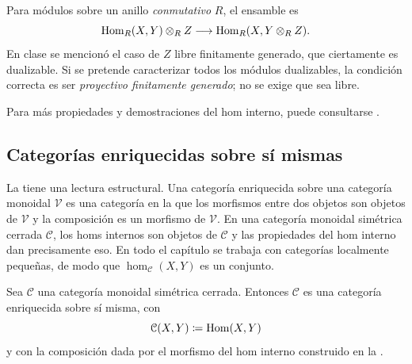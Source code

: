 \begin{nota}
Para módulos sobre un anillo \emph{conmutativo} $R$, el ensamble es
\[
\operatorname{Hom}_R(X,Y)\otimes_R Z\longrightarrow\operatorname{Hom}_R(X,Y\otimes_R Z).
\]
En clase se mencionó el caso de $Z$ libre finitamente generado, que ciertamente es dualizable. Si se pretende caracterizar todos los módulos dualizables, la condición correcta es ser \emph{proyectivo finitamente generado}; no se exige que sea libre.
\end{nota}

Para más propiedades y demostraciones del hom interno, puede consultarse \cite{malkiewich}.


\subsection{Categorías enriquecidas sobre sí mismas}

La  tiene una lectura estructural. Una categoría enriquecida sobre una categoría monoidal $\mathcal V$ es una categoría en la que los morfismos entre dos objetos son objetos de $\mathcal V$ y la composición es un morfismo de $\mathcal V$. En una categoría monoidal simétrica cerrada $\mathcal C$, los homs internos son objetos de $\mathcal C$ y las propiedades del hom interno dan precisamente eso. En todo el capítulo se trabaja con categorías localmente pequeñas, de modo que $\hom_{\mathcal C}(X,Y)$ es un conjunto.

\begin{prop}\label{prop:enriquecida}
Sea $\mathcal C$ una categoría monoidal simétrica cerrada. Entonces $\mathcal C$ es una categoría enriquecida sobre sí misma, con
\[
\mathcal C(X,Y)\coloneqq\operatorname{Hom}(X,Y)
\]
y con la composición dada por el morfismo del hom interno construido en la .
\end{prop}

